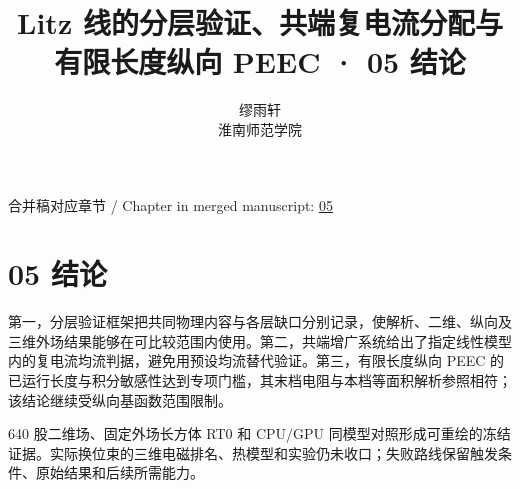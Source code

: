 \documentclass[11pt]{article}
\begin{document}
\title{Litz 线的分层验证、共端复电流分配与有限长度纵向 PEEC · 05 结论}
\author{缪雨轩\\淮南师范学院}
\date{}
\maketitle
\noindent 合并稿对应章节 / Chapter in merged manuscript: \href{paper_zh-CN_single.pdf#chapter-05}{05}\par
\FloatBarrier
\section*{05 结论}
\hypertarget{chapter-05}{}
第一，分层验证框架把共同物理内容与各层缺口分别记录，使解析、二维、纵向及三维外场结果能够在可比较范围内使用。第二，共端增广系统给出了指定线性模型内的复电流均流判据，避免用预设均流替代验证。第三，有限长度纵向 PEEC 的已运行长度与积分敏感性达到专项门槛，其末档电阻与本档等面积解析参照相符；该结论继续受纵向基函数范围限制。


640 股二维场、固定外场长方体 RT0 和 CPU/GPU 同模型对照形成可重绘的冻结证据。实际换位束的三维电磁排名、热模型和实验仍未收口；失败路线保留触发条件、原始结果和后续所需能力。
\end{document}

